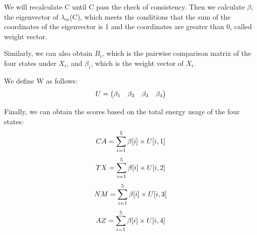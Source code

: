 \documentclass[a4paper,11pt]{article}
\begin{document}
\par We will recalculate C until C pass the check of consistency. Then we calculate $\beta$, the eigenvector of $\lambda_m$(C), which meets the conditions that the sum of the coordinates of the eigenvector is 1 and the coordinates are greater than 0, called weight vector.
\par Similarly, we can also obtain $B_i$, which is the pairwise comparison matrix of the four states under $X_i$, and $\beta_i$, which is the weight vector of $X_i$.
\par We define W as follows: %
\begin{equation}
    \centering
U=\begin{pmatrix} \beta_1 & \beta_2 & \beta_3 & \beta_4\end{pmatrix}
\end{equation}
\par Finally, we can obtain the scores based on the total energy usage of the four states:
\begin{equation}
    \centering
    CA=\sum_{i=1}^{5}\beta[i] \times U[i,1]
\end{equation}
\begin{equation}
    \centering
    TX=\sum_{i=1}^{5}\beta[i] \times U[i,2]
\end{equation}
\begin{equation}
    \centering
    NM=\sum_{i=1}^{5}\beta[i] \times U[i,3]
\end{equation}
\begin{equation}
    \centering
    AZ=\sum_{i=1}^{5}\beta[i] \times U[i,4]
\end{equation}

\end{document}
